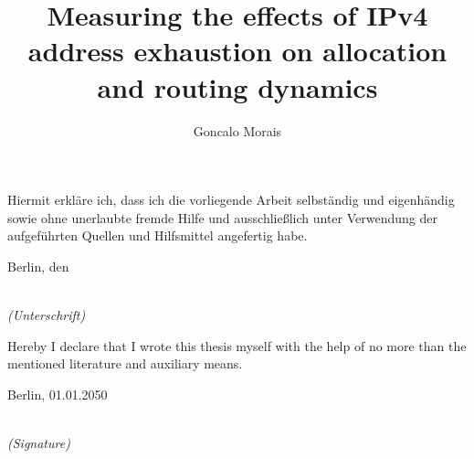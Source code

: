 \documentclass[11pt,a4paper]{scrreprt}
\title{\textbf{Measuring the effects of IPv4 address exhaustion on allocation and routing dynamics}}
\author{Goncalo Morais}
\date{}
\begin{document}
\maketitle

\setcounter{chapter}{0}
\clearpage
\begin{large}

\vspace*{6cm}

\noindent
Hiermit erkl\"{a}re ich, dass ich die vorliegende Arbeit selbst\"{a}ndig und eigenh\"{a}ndig sowie ohne unerlaubte fremde Hilfe und ausschlie\ss lich unter Verwendung der aufgef\"{u}hrten Quellen und Hilfsmittel angefertig habe.
\vspace{2cm}

\noindent
Berlin, den

\vspace{3cm}

\hspace*{7cm}%
\dotfill\\
\hspace*{8.5cm}%
\textit{(Unterschrift)}

\end{large}

\clearpage

\begin{large}

\vspace*{6cm}

\noindent
Hereby I declare that I wrote this thesis myself with the help of no more than the mentioned literature and auxiliary means.
\vspace{2cm}

\noindent
Berlin, 01.01.2050

\vspace{3cm}

\hspace*{7cm}%
\dotfill\\
\hspace*{8.5cm}%
\textit{(Signature)}

\end{large}
\end{document}
